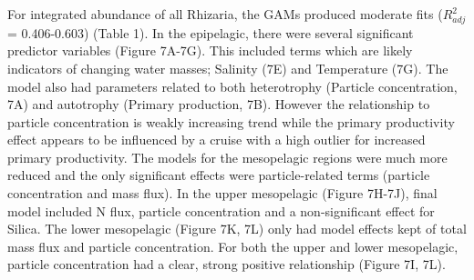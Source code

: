 \documentclass[
]{article}
\begin{document}
For integrated abundance of all Rhizaria, the GAMs produced moderate
fits (\(R^2_{adj}\) = 0.406-0.603) (Table 1). In the epipelagic, there
were several significant predictor variables (Figure 7A-7G). This
included terms which are likely indicators of changing water masses;
Salinity (7E) and Temperature (7G). The model also had parameters
related to both heterotrophy (Particle concentration, 7A) and autotrophy
(Primary production, 7B). However the relationship to particle
concentration is weakly increasing trend while the primary productivity
effect appears to be influenced by a cruise with a high outlier for
increased primary productivity. The models for the mesopelagic regions
were much more reduced and the only significant effects were
particle-related terms (particle concentration and mass flux). In the
upper mesopelagic (Figure 7H-7J), final model included N flux, particle
concentration and a non-significant effect for Silica. The lower
mesopelagic (Figure 7K, 7L) only had model effects kept of total mass
flux and particle concentration. For both the upper and lower
mesopelagic, particle concentration had a clear, strong positive
relationship (Figure 7I, 7L).
\end{document}
